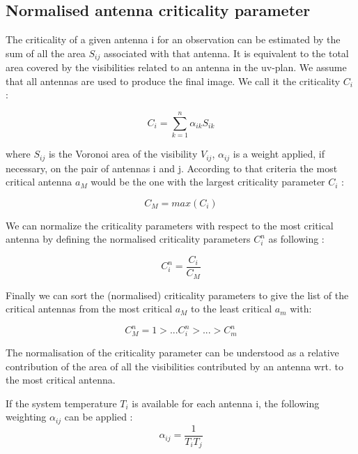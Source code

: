 \documentclass{aa}
\begin{document}
\begin{appendix}
\subsection{Normalised antenna criticality parameter}


The criticality of  a given antenna i for an observation can be estimated by the sum of all the area $S_{ij}$ associated with that antenna. It is equivalent to 
the total area covered by the visibilities related to an antenna in the uv-plan. We assume that all antennas are used to produce the final image. We call it the
criticality $C_i$ :

\begin{equation}
 C_i = \sum_{k = 1}^{n} \alpha _{ik} S_{ik}
\end{equation}

where $S_{ij}$ is the Voronoi area of the visibility $V_{ij}$, $\alpha_{ij}$ is a weight applied, if necessary, on the pair of antennas i and j. According to that criteria the most critical antenna $a_M$  would be the one with the largest criticality parameter $C_i$ :

\begin{equation}
 C_M = max(C_i)
\end{equation}

We can normalize the criticality parameters with respect to the most critical antenna by defining the  normalised criticality parameters $C_i^n$ as following :

\begin{equation}
    C_i^n = \frac{C_i}{C_M}
    \label{eqn_normvoronoi}
\end{equation}


Finally we can sort the (normalised) criticality parameters to give the list of the critical antennas from the most critical $a_M$ to the least critical $a_m$ with:

\begin{equation}
    C_M^n = 1 > ... C_i^n > ... > C_m^n
\end{equation}

The normalisation of the criticality parameter can be understood as a relative contribution of the area of all the visibilities contributed by an antenna wrt. to the most critical antenna.

If the system temperature $T_i$ is available for each antenna i, the following weighting $\alpha_{ij}$ can be applied :
\begin{equation}
\alpha_{ij} = \frac{1}{T_iT_j}    
\end{equation}




\end{appendix}
\end{document}

